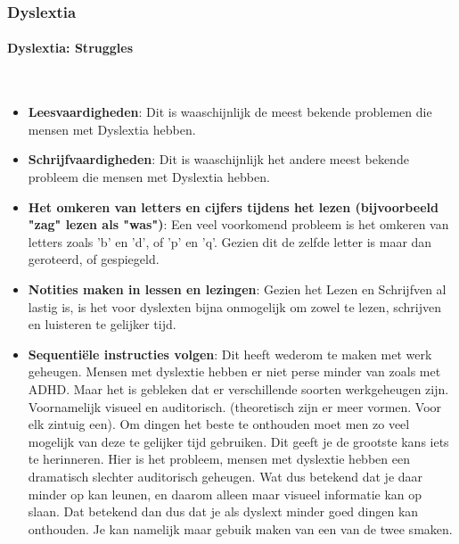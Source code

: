 \documentclass{article}
\begin{document}
            \subsubsection{Dyslextia}
                \paragraph{Dyslextia: Struggles}\\
                    \begin{itemize}
                        \item \textbf{Leesvaardigheden}\cite{dyslextia-struggles-and-superpowers}:
                            Dit is waaschijnlijk de meest bekende problemen die mensen met Dyslextia hebben. 
                        \item \textbf{Schrijfvaardigheden}:
                            Dit is waaschijnlijk het andere meest bekende probleem die mensen met Dyslextia hebben.
                        \item \textbf{Het omkeren van letters en cijfers tijdens het lezen (bijvoorbeeld "zag" lezen als "was")}\cite{dyslextia-struggles-and-superpowers}:
                            Een veel voorkomend probleem is het omkeren van letters zoals 'b' en 'd', of 'p' en 'q'. Gezien dit de zelfde letter is maar dan geroteerd, of gespiegeld.
                        \item \textbf{Notities maken in lessen en lezingen}\cite{dyslextia-struggles-and-superpowers}:
                            Gezien het Lezen en Schrijfven al lastig is, is het voor dyslexten bijna onmogelijk om zowel te lezen, schrijven en luisteren te gelijker tijd.
                        \item \textbf{Sequentiële instructies volgen}\cite{dyslextia-struggles-and-superpowers}:
                            Dit heeft wederom te maken met werk geheugen. Mensen met dyslextie hebben er niet perse minder van zoals met ADHD. Maar het is gebleken dat er verschillende soorten werkgeheugen zijn\cite{dyslextia-different-types-of-memory}. Voornamelijk visueel en auditorisch. (theoretisch zijn er meer vormen. Voor elk zintuig een). Om dingen het beste te onthouden moet men zo veel mogelijk van deze te gelijker tijd gebruiken. Dit geeft je de grootste kans iets te herinneren. Hier is het probleem, mensen met dyslextie hebben een dramatisch slechter auditorisch geheugen. Wat dus betekend dat je daar minder op kan leunen, en daarom alleen maar visueel informatie kan op slaan. Dat betekend dan dus dat je als dyslext minder goed dingen kan onthouden. Je kan namelijk maar gebuik maken van een van de twee smaken.

\end{itemize}
\end{document}
